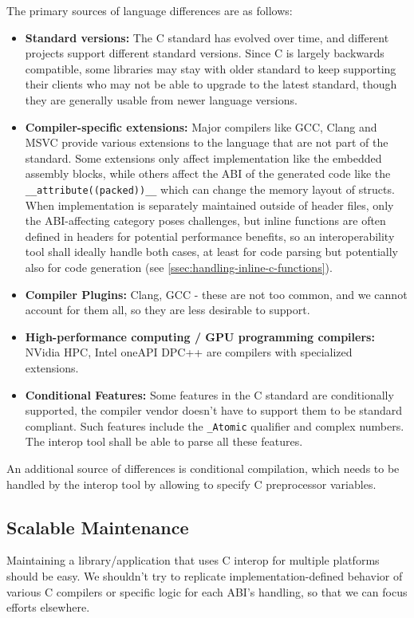 The primary sources of language differences are as follows:
\begin{itemize}
    \item \textbf{Standard versions:} The C standard has evolved over time, and different projects support different standard versions. Since C is largely backwards compatible, some libraries may stay with older standard to keep supporting their clients who may not be able to upgrade to the latest standard, though they are generally usable from newer language versions.
    \item \textbf{Compiler-specific extensions:} Major compilers like GCC, Clang and MSVC provide various extensions to the language that are not part of the standard. Some extensions only affect implementation like the embedded assembly blocks, while others affect the ABI of the generated code like the \verb|__attribute((packed))__| which can change the memory layout of structs. When implementation is separately maintained outside of header files, only the ABI-affecting category poses challenges, but inline functions are often defined in headers for potential performance benefits, so an interoperability tool shall ideally handle both cases, at least for code parsing but potentially also for code generation (see \autoref{ssec:handling-inline-c-functions}).
    \item \textbf{Compiler Plugins:} Clang, GCC - these are not too common, and we cannot account for them all, so they are less desirable to support. 
    \item \textbf{High-performance computing / GPU programming compilers:} NVidia HPC, Intel oneAPI DPC++ are compilers with specialized extensions.
    \item \textbf{Conditional Features:} Some features in the C standard are conditionally supported, the compiler vendor doesn't have to support them to be standard compliant. Such features include the \verb|_Atomic| qualifier and complex numbers. The interop tool shall be able to parse all these features.
\end{itemize}
 
An additional source of differences is conditional compilation, which needs to be handled by the interop tool by allowing to specify C preprocessor variables.

\subsection{Scalable Maintenance}
Maintaining a library/application that uses C interop for multiple platforms should be easy. We shouldn't try to replicate implementation-defined behavior of various C compilers or specific logic for each ABI's handling, so that we can focus efforts elsewhere.

